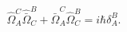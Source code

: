 \begin{equation}\label{4.11}
\hat{\Omega}_A^C\hat{\bar{\Omega}}_C^B+
\hat{\bar{\Omega}}_A^C\hat{\Omega}_C^B=i\hbar\delta^B_A.
\end{equation}


